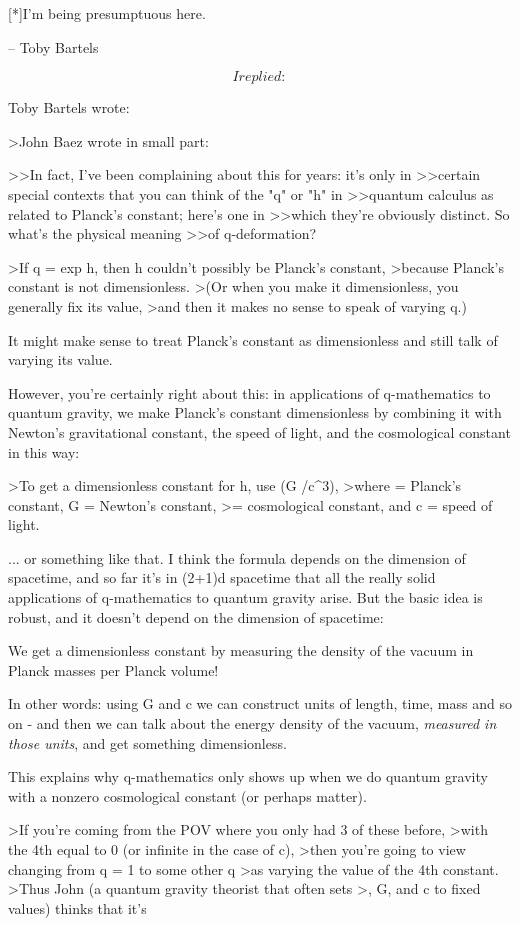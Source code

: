 [*]I'm being presumptuous here.

-- Toby Bartels


$$
    

I replied:
$$


Toby Bartels wrote:

>John Baez wrote in small part:

>>In fact, I've been complaining about this for years: it's only in
>>certain special contexts that you can think of the "q" or "h" in
>>quantum calculus as related to Planck's constant; here's one in
>>which they're obviously distinct.  So what's the physical meaning
>>of q-deformation?

>If q = exp h, then h couldn't possibly be Planck's constant,
>because Planck's constant is not dimensionless.
>(Or when you make it dimensionless, you generally fix its value,
>and then it makes no sense to speak of varying q.)

It might make sense to treat Planck's constant as dimensionless 
and still talk of varying its value.  

However, you're certainly right about this: in applications of 
q-mathematics to quantum gravity, we make Planck's constant 
dimensionless by combining it with Newton's gravitational 
constant, the speed of light, and the cosmological constant in this way:

>To get a dimensionless constant for h, use (\hbar  G \Lambda /c^3),
>where \hbar  = Planck's constant, G = Newton's constant,
>\Lambda  = cosmological constant, and c = speed of light.

... or something like that.  I think the formula depends on 
the dimension of spacetime, and so far it's in (2+1)d spacetime
that all the really solid applications of q-mathematics to
quantum gravity arise.  But the basic idea is robust, and it
doesn't depend on the dimension of spacetime:

We get a dimensionless constant by measuring the density of
the vacuum in Planck masses per Planck volume!

In other words: using \hbar  G and c we can construct units of
length, time, mass and so on - and then we can talk about the
energy density of the vacuum, \emph{measured in those units}, and
get something dimensionless.

This explains why q-mathematics only shows up when we do 
quantum gravity with a nonzero cosmological constant (or perhaps
matter).

>If you're coming from the POV where you only had 3 of these before,
>with the 4th equal to 0 (or infinite in the case of c),
>then you're going to view changing from q = 1 to some other q
>as varying the value of the 4th constant.
>Thus John (a quantum gravity theorist that often sets
>\hbar , G, and c to fixed values) thinks that it's \Lambda  [...]


